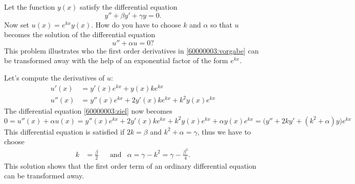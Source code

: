 Let the function
$y(x)$
satisfy the differential equation
\begin{equation}
y''+\beta y' + \gamma y=0.
\label{60000003:vorgabe}
\end{equation}
Now set
$u(x)=e^{k x}y(x)$.
How do you have to choose $k$ and $\alpha$ so that $u$ becomes the solution
of the differential equation
\begin{equation}
u''+\alpha u=0?
\label{60000003:ziel}
\end{equation}
This problem illustrates who the first order derivatives in
\eqref{60000003:vorgabe}
can be transformed away with the help of an exponential factor
of the form $e^{kx}$.

\begin{loesung}
Let's compute the derivatives of $u$:
\begin{align*}
u'(x)&=y'(x)e^{kx}+y(x)ke^{kx}\\
u''(x)&=y''(x)e^{kx}+2y'(x)ke^{kx}+k^2y(x)e^{kx}
\end{align*}
The differential equation 
\eqref{60000003:ziel} now becomes
\[
0
=
u''(x)+\alpha u(x)
=
y''(x)e^{kx}+2y'(x)ke^{kx}+k^2y(x)e^{kx}
+ \alpha y(x)e^{kx}
=
\bigl(
y''+2k y' +(k^2+\alpha)y
\bigr)
e^{kx}
\]
This differential equation is satisfied if 
$2k=\beta$ and
$k^2+\alpha=\gamma$, thus we have to choose
\[
\begin{aligned}
k&=\frac{\beta}2
&
&\text{and}&
\alpha=\gamma-k^2=\gamma-\frac{\beta^2}4.
\end{aligned}
\]
This solution shows that the first order term of an ordinary differential
equation can be transformed away.
\end{loesung}

